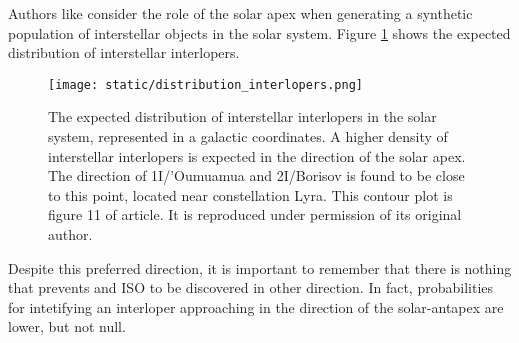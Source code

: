 Authors like \cite{marceta2023} consider the role of the solar apex when
generating a synthetic population of interstellar objects in the solar system.
Figure \ref{fig:distribution_interlopers} shows the expected distribution of
interstellar interlopers.

\vspace{1cm}

\begin{figure}[H]
  \centering
  \texttt{[image: static/distribution\_interlopers.png]}
  \caption[Expected interstellar interlopers distribution in the solar system.]{The
    expected distribution of interstellar interlopers in the solar system, represented in
    a galactic coordinates. A higher density of interstellar interlopers is expected in
    the direction of the solar apex. The direction of 1I/'Oumuamua and 2I/Borisov
    is found to be close to this point, located near constellation Lyra.
    This contour plot is figure 11 of \cite{marceta2023} article. It is
    reproduced under permission of its original author.
  }
  \label{fig:distribution_interlopers}
\end{figure}

Despite this preferred direction, it is important to remember that there is
nothing that prevents and ISO to be discovered in other direction. In fact,
probabilities for intetifying an interloper approaching in the direction of the
solar-antapex are lower, but not null.
